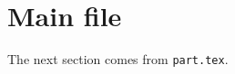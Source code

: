 \documentclass{article}
\begin{document}
\section{Main file}
The next section comes from \texttt{part.tex}.


\end{document}
